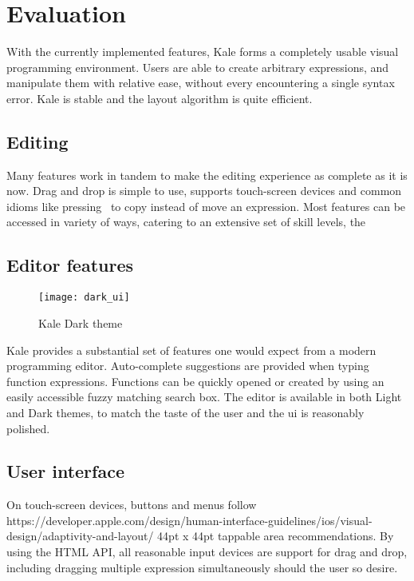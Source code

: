 \chapter{Evaluation}

With the currently implemented features, Kale forms a completely
usable visual programming environment. Users are able to create
arbitrary expressions, and manipulate them with relative ease, without
every encountering a single syntax error. Kale is stable and the layout
algorithm is quite efficient.

\section{Editing}
Many features work in tandem to make the editing experience as complete as it
is now. Drag and drop is simple to use, supports touch-screen devices and
common idioms like pressing~\keys{\ctrl} to copy instead of move an expression.
Most features can be accessed in variety of ways, catering to an extensive
set of skill levels, the 


\section{Editor features}
\begin{wrapfigure}[11]{r}{8cm}
\texttt{[image: dark\_ui]}	
\caption{Kale Dark theme}
\end{wrapfigure}

Kale provides a substantial set of features one would expect from a modern
programming editor. Auto-complete suggestions are provided when typing
function expressions. Functions can be quickly opened or created by using an
easily accessible fuzzy matching search box. The editor is available in both
Light and Dark themes, to match the taste of the user and the \ac{ui} is
reasonably polished.

\section{User interface}
On touch-screen devices, buttons and menus follow
{https://developer.apple.com/design/human-interface-guidelines/ios/visual-design/adaptivity-and-layout/}
44pt x 44pt tappable area recommendations. By using the HTML
 API,
all reasonable input devices are support for drag and drop, including dragging
multiple expression simultaneously should the user so desire.

